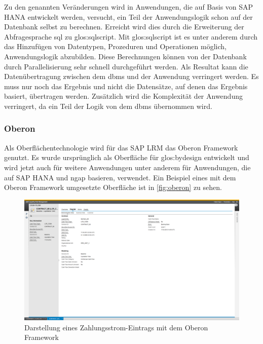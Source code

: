\begin{onehalfspacing}
Zu den genannten Veränderungen wird in Anwendungen, die auf Basis von SAP HANA entwickelt werden, versucht, ein Teil der Anwendungslogik schon auf der Datenbank selbst zu berechnen. Erreicht wird dies durch die Erweiterung der Abfragesprache \gls{sql} zu \gls{glos:sqlscript}. Mit \gls{glos:sqlscript} ist es unter anderem durch das Hinzufügen von Datentypen, Prozeduren und Operationen möglich, Anwendungslogik abzubilden. Diese Berechnungen können von der Datenbank durch Parallelisierung sehr schnell durchgeführt werden. Als Resultat kann die Datenübertragung zwischen dem \gls{dbms} und der Anwendung verringert werden. Es muss nur noch das Ergebnis und nicht die Datensätze, auf denen das Ergebnis basiert, übertragen werden. Zusätzlich wird die Komplexität der Anwendung verringert, da ein Teil der Logik von dem \gls{dbms} übernommen wird.

\subsubsection{Oberon}
Als Oberflächentechnologie wird für das SAP LRM das Oberon Framework genutzt. Es wurde ursprünglich als Oberfläche für \gls{glos:bydesign} entwickelt und wird jetzt auch für weitere Anwendungen unter anderem für Anwendungen, die auf SAP HANA und \gls{ngap} basieren, verwendet. Ein Beispiel eines mit dem Oberon Framework umgesetzte Oberfläche ist in \vref{fig:oberon} zu sehen.

\begin{figure}[!ht]
\centering
\setlength{\unitlength}{1mm}
\includegraphics[width=15cm]{images/OberonUI.png}
\caption{Darstellung eines Zahlungsstrom-Eintrags mit dem Oberon Framework\label{fig:oberon}}
\end{figure}


\end{onehalfspacing}

